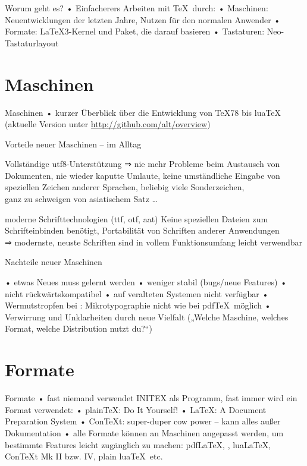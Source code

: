 \documentclass[t]{beamer}
\begin{document}
\begin{frame}{Worum geht es?}
• Einfacherers Arbeiten mit \TeX\ durch:
• Maschinen: Neuentwicklungen der letzten Jahre, Nutzen für den normalen Anwender
• Formate: \LaTeX3-Kernel und Paket, die darauf basieren
• Tastaturen: Neo-Tastaturlayout
\•
\end{frame}

\section{Maschinen}
\begin{frame}{Maschinen}
• kurzer Überblick über die Entwicklung von \TeX78 bis lua\TeX\\
(aktuelle Version unter \url{http://github.com/alt/overview})
\•
\end{frame}

\begin{frame}{Vorteile neuer Maschinen – im Alltag}
\begin{block}{Vollständige utf8-Unterstützung}
⇒ nie mehr Probleme beim Austausch von Dokumenten, nie wieder kaputte Umlaute, keine umständliche Eingabe von speziellen Zeichen anderer Sprachen, beliebig viele Sonderzeichen,\\
ganz zu schweigen von asiatischem Satz …
\end{block}

\begin{block}{moderne Schrifttechnologien (ttf, otf, aat)}
Keine speziellen Dateien zum Schrifteinbinden benötigt, Portabilität von Schriften anderer Anwendungen\\
⇒ modernste, neuste Schriften sind in vollem Funktionsumfang leicht verwendbar
\end{block}
\end{frame}

\begin{frame}{Nachteile neuer Maschinen}
\begin{block}{}
• etwas Neues muss gelernt werden
• weniger stabil (bugs/neue Features)
• nicht rückwärtskompatibel
• auf veralteten Systemen nicht verfügbar
• Wermutstropfen bei \XeTeX: Mikrotypographie nicht wie bei pdf\TeX\ möglich
• Verwirrung und Unklarheiten durch neue Vielfalt („Welche Maschine, welches Format, welche Distribution nutzt du?“)
\•
\end{block}
\end{frame}

\section{Formate}
\begin{frame}{Formate}
• fast niemand verwendet INITEX als Programm, fast immer wird ein Format verwendet:
• plain\TeX: Do It Yourself!
• \LaTeX: A Document Preparation System
• Con\TeX t: super-duper cow power – kann alles außer Dokumentation\pause
• alle Formate können an Maschinen angepasst werden, um bestimmte Features leicht zugänglich zu machen: pdf\LaTeX, \XeLaTeX, lua\LaTeX, Con\TeX t Mk II bzw. IV, plain lua\TeX\ etc.
\•
\end{frame}
\end{document}
